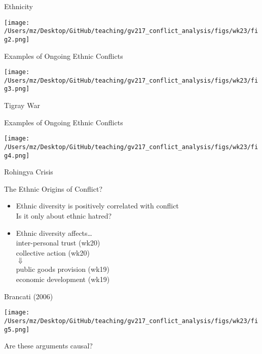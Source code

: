 \documentclass[handout]{beamer}
\begin{document}
\begin{frame}{Ethnicity}
    \pause
    \begin{center}
        \texttt{[image: /Users/mz/Desktop/GitHub/teaching/gv217\_conflict\_analysis/figs/wk23/fig2.png]}
    \end{center}
\end{frame}

\begin{frame}{Examples of Ongoing Ethnic Conflicts}
    \pause
    \begin{center}
        \texttt{[image: /Users/mz/Desktop/GitHub/teaching/gv217\_conflict\_analysis/figs/wk23/fig3.png]}
    \end{center}
    \pause Tigray War
\end{frame}

\begin{frame}{Examples of Ongoing Ethnic Conflicts}
    \pause
    \begin{center}
        \texttt{[image: /Users/mz/Desktop/GitHub/teaching/gv217\_conflict\_analysis/figs/wk23/fig4.png]}
    \end{center}
    \pause Rohingya Crisis
\end{frame}

\begin{frame}{The Ethnic Origins of Conflict?}
    \begin{itemize}
        \pause\item Ethnic diversity is positively correlated with conflict\\
        \pause      Is it only about ethnic hatred?
        \pause\item Ethnic diversity affects\dots\\
        \pause      inter-personal trust (wk20)\\
        \pause      collective action (wk20)\\
        \pause      \(\Downarrow\)\\
        \pause      public goods provision (wk19)\\
        \pause      economic development (wk19)
    \end{itemize}
\end{frame}

\begin{frame}{Brancati (2006)}
    \pause
    \begin{center}
        \texttt{[image: /Users/mz/Desktop/GitHub/teaching/gv217\_conflict\_analysis/figs/wk23/fig5.png]}
    \end{center}
    \pause Are these arguments causal?
\end{frame}
\end{document}

